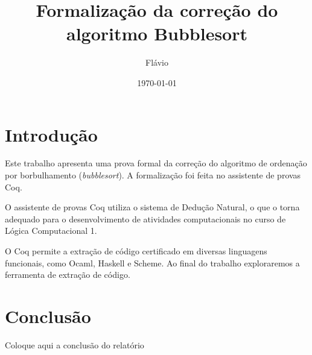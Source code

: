 \documentclass{article}
\title{Formalização da correção do algoritmo Bubblesort}
\author{Flávio}
\date{\today}
\begin{document}
\maketitle

\section{Introdução}

Este trabalho apresenta uma prova formal da correção do algoritmo de ordenação por borbulhamento ({\em bubblesort}). A formalização foi feita no assistente de provas Coq.

O assistente de provas Coq utiliza o sistema de Dedução Natural, o que o torna adequado para o desenvolvimento de atividades computacionais no curso de Lógica Computacional 1.

O Coq permite a extração de código certificado em diversas linguagens funcionais, como Ocaml, Haskell e Scheme. Ao final do trabalho exploraremos a ferramenta de extração de código.



\section{Conclusão}

Coloque aqui a conclusão do relatório
\end{document}

